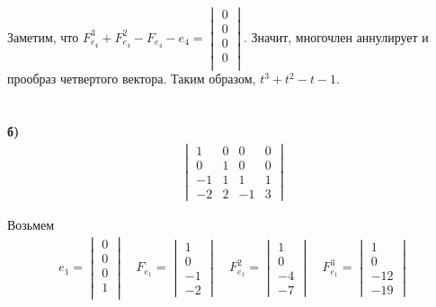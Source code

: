 		Заметим, что $F^{3}_{e_{4}} + F^{2}_{e_{4}} - F_{e_{4}} - e_{4} = \begin{vmatrix} 0\\ 0\\ 0\\ 0\\ \end{vmatrix}$. Значит, многочлен аннулирует и прообраз четвертого вектора. Таким образом, $t^{3} + t^{2} - t - 1$.\\
		\\\\
		\textbf{б)}
		\begin{gather*}
			\begin{vmatrix}
				1 & 0 & 0 & 0\\
				0 & 1 & 0 & 0\\
				-1 & 1 & 1 & 1\\
				-2 & 2 & -1 & 3
			\end{vmatrix}
		\end{gather*}
		
		Возьмем 
		\begin{gather*}
			e_{1} = 
			\begin{vmatrix}
				0\\ 0\\ 0\\ 1\\
			\end{vmatrix}
		\quad
			F_{e_{1}} =
			\begin{vmatrix}
				1\\ 0\\ -1\\ -2
			\end{vmatrix}
		\quad
			F^{2}_{e_{1}} =
			\begin{vmatrix}
				1\\ 0\\ -4\\ -7
			\end{vmatrix}
		\quad 
			F^{3}_{e_{1}} = 
			\begin{vmatrix}
				1\\ 0\\ -12\\ -19
			\end{vmatrix}
		\end{gather*}
		
